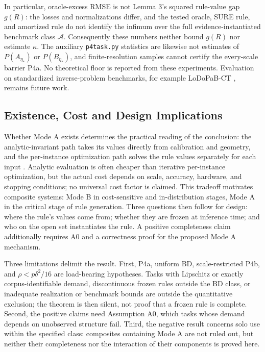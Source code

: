 \documentclass[twoside,11pt]{article}
\newcommand{\ttu}{\textunderscore\allowbreak}
\begin{document}
In particular, oracle-excess RMSE is not Lemma 3's squared rule-value gap $g(R)$: the losses and normalizations differ, and the tested oracle, SURE rule, and amortized rule do not identify the infimum over the full evidence-instantiated benchmark class $\mathcal{A}$. Consequently these numbers neither bound $g(R)$ nor estimate $\kappa$. The auxiliary \texttt{p4\ttu task.py} statistics are likewise not estimates of $P(A_{\eta_*})$ or $P(B_{\eta_*})$, and finite-resolution samples cannot certify the every-scale barrier P4a. No theoretical floor is reported from these experiments. Evaluation on standardized inverse-problem benchmarks, for example LoDoPaB-CT \citep{leuschner2021}, remains future work.

\subsection{Existence, Cost and Design Implications}
\label{sec:cost}

Whether Mode A exists determines the practical reading of the conclusion: the analytic-invariant path takes its values directly from calibration and geometry, and the per-instance optimization path solves the rule values separately for each input \citep{sun2020}. Analytic evaluation is often cheaper than iterative per-instance optimization, but the actual cost depends on scale, accuracy, hardware, and stopping conditions; no universal cost factor is claimed. This tradeoff motivates composite systems: Mode B in cost-sensitive and in-distribution stages, Mode A in the critical stage of rule generation. Three questions then follow for design: where the rule's values come from; whether they are frozen at inference time; and who on the open set instantiates the rule. A positive completeness claim additionally requires A0 and a correctness proof for the proposed Mode A mechanism.

Three limitations delimit the result. First, P4a, uniform BD, scale-restricted P4b, and $\rho<p\delta^2/16$ are load-bearing hypotheses. Tasks with Lipschitz or exactly corpus-identifiable demand, discontinuous frozen rules outside the BD class, or inadequate realization or benchmark bounds are outside the quantitative exclusion; the theorem is then silent, not proof that a frozen rule is complete. Second, the positive claims need Assumption A0, which tasks whose demand depends on unobserved structure fail. Third, the negative result concerns solo use within the specified class: composites containing Mode A are not ruled out, but neither their completeness nor the interaction of their components is proved here.
\end{document}
